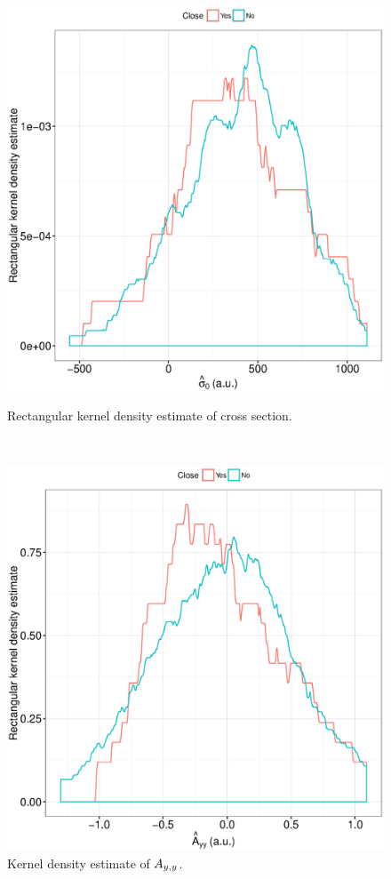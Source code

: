 \documentclass{article}
\begin{document}
\begin{figure}[h]
	\centering
	\begin{minipage}{.5\textwidth}
		\centering
		\includegraphics[scale=.5]{CS0_au_dens.eps}
		\caption{Rectangular kernel density estimate of cross section.\label{fig:CS0au_dens}}
	\end{minipage}~~~~ %
	\begin{minipage}{.5\textwidth}
		\centering
		\includegraphics[scale=.5]{Ayy_dens.eps}
		\caption{Kernel density estimate of $\Ayy$.\label{fig:Ayy_dens}}
	\end{minipage}
	
\end{figure}
\end{document}
